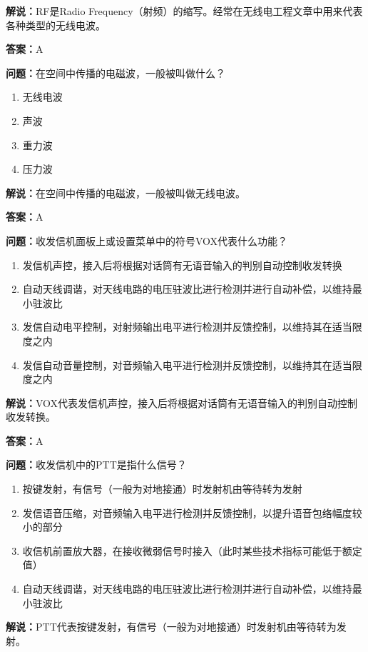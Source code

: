 \textbf{解说：}RF是Radio Frequency（射频）的缩写。经常在无线电工程文章中用来代表各种类型的无线电波。

\textbf{答案：}A

\textbf{问题：}在空间中传播的电磁波，一般被叫做什么？

\begin{enumerate}[label=\Alph*), leftmargin=3em]
	\item 无线电波
	\item 声波
	\item 重力波
	\item 压力波
\end{enumerate}

\textbf{解说：}在空间中传播的电磁波，一般被叫做无线电波。%

\textbf{答案：}A

\textbf{问题：}收发信机面板上或设置菜单中的符号VOX代表什么功能？

\begin{enumerate}[label=\Alph*), leftmargin=3em]
	\item 发信机声控，接入后将根据对话筒有无语音输入的判别自动控制收发转换
	\item 自动天线调谐，对天线电路的电压驻波比进行检测并进行自动补偿，以维持最小驻波比
	\item 发信自动电平控制，对射频输出电平进行检测并反馈控制，以维持其在适当限度之内
	\item 发信自动音量控制，对音频输入电平进行检测并反馈控制，以维持其在适当限度之内
\end{enumerate}

\textbf{解说：}VOX代表发信机声控，接入后将根据对话筒有无语音输入的判别自动控制收发转换。%

\textbf{答案：}A

\textbf{问题：}收发信机中的PTT是指什么信号？

\begin{enumerate}[label=\Alph*), leftmargin=3em]
	\item 按键发射，有信号（一般为对地接通）时发射机由等待转为发射
	\item 发信语音压缩，对音频输入电平进行检测并反馈控制，以提升语音包络幅度较小的部分
	\item 收信机前置放大器，在接收微弱信号时接入（此时某些技术指标可能低于额定值）
	\item 自动天线调谐，对天线电路的电压驻波比进行检测并进行自动补偿，以维持最小驻波比
\end{enumerate}

\textbf{解说：}PTT代表按键发射，有信号（一般为对地接通）时发射机由等待转为发射。%

